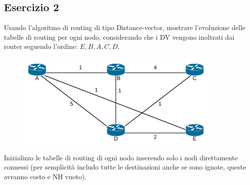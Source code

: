 \documentclass[10pt]{article}
\begin{document}
	\subsection{Esercizio 2}
	Usando l'algoritmo di routing di tipo Distance-vector, mostrare l'evoluzione delle tabelle di routing per ogni nodo, considerando che i DV vengono inoltrati dai router seguendo l'ordine: ${E,B,A,C,D}$.
	\begin{figure}[h!]
	\centering
	\includegraphics[width=10cm]{esercizio2}
	\end{figure}
	\newline
	Inizializzo le tabelle di routing di ogni nodo inserendo solo i nodi direttamente connessi (per semplicità includo tutte le destinazioni anche se sono ignote, queste avranno costo e NH vuoto).
\end{document}
